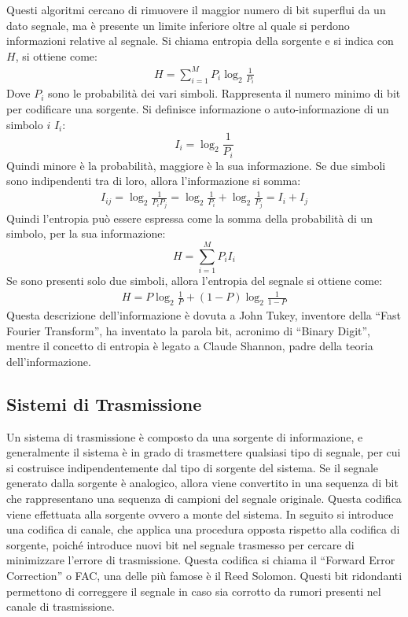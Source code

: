 \documentclass{article}
\numberwithin{equation}{subsection}
\begin{document}
Questi algoritmi cercano di rimuovere il maggior numero di bit superflui da un dato segnale, ma è presente un limite inferiore oltre al quale si perdono informazioni 
relative al segnale. 
Si chiama entropia della sorgente e si indica con $H$, si ottiene come:
\begin{gather*}
    H=\displaystyle\sum_{i=1}^MP_i\log_2\frac{1}{P_i}
\end{gather*}
Dove $P_i$ sono le probabilità dei vari simboli. Rappresenta il numero minimo di bit per codificare una sorgente. 
Si definisce informazione o auto-informazione di un simbolo $i$ $I_i$:
\begin{equation}
    I_i=\log_2\displaystyle\frac{1}{P_i}
\end{equation}
Quindi minore è la probabilità, maggiore è la sua informazione. Se due simboli sono indipendenti tra di loro, allora l'informazione si somma:
\begin{gather*}
    I_{ij}=\log_2\displaystyle\frac{1}{P_iP_j}=\log_2\displaystyle\frac{1}{P_i}+\log_2\displaystyle\frac{1}{P_j}=I_i+I_j
\end{gather*}
Quindi l'entropia può essere espressa come la somma della probabilità di un simbolo, per la sua informazione:
\begin{equation}
    H=\displaystyle\sum_{i=1}^MP_iI_i
\end{equation}
Se sono presenti solo due simboli, allora l'entropia del segnale si ottiene come:
\begin{gather*}
    H=P\log_2\displaystyle\frac{1}{P}+(1-P)\log_2\frac{1}{1-P}
\end{gather*}
Questa descrizione dell'informazione è dovuta a John Tukey, inventore della ``Fast Fourier Transform'', ha inventato la parola bit, acronimo di ``Binary Digit'', 
mentre il concetto di entropia è legato a Claude Shannon, padre della teoria dell'informazione. 

\subsection{Sistemi di Trasmissione}

Un sistema di trasmissione è composto da una sorgente di informazione, e generalmente il sistema è in grado di trasmettere qualsiasi tipo di segnale, per cui si costruisce 
indipendentemente dal tipo di sorgente del sistema. Se il segnale generato dalla sorgente è analogico, allora viene convertito in una sequenza di bit che rappresentano una 
sequenza di campioni del segnale originale. 
Questa codifica viene effettuata alla sorgente ovvero a monte del sistema. 
In seguito si introduce una codifica di canale, che applica una procedura opposta rispetto alla codifica di sorgente, poiché introduce nuovi bit nel segnale trasmesso 
per cercare di minimizzare l'errore di trasmissione. Questa codifica si chiama il ``Forward Error Correction'' o FAC, una delle più famose è il Reed Solomon. 
Questi bit ridondanti permettono di correggere il segnale in caso sia corrotto da rumori presenti nel canale di trasmissione.  
\end{document}
